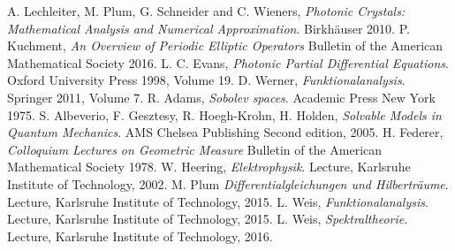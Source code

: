 \begin{thebibliography}{00}
   A. Lechleiter, M. Plum, G. Schneider and C. Wieners, {\it Photonic Crystals: Mathematical Analysis and Numerical Approximation}. Birkh{\"a}user 2010.
   P. Kuchment, {\it An Overview of Periodic Elliptic Operators} Bulletin of the American Mathematical Society 2016.
   L. C. Evans, {\it Photonic Partial Differential Equations}. Oxford University Press 1998, Volume 19.
   D. Werner, {\it Funktionalanalysis}. Springer 2011, Volume 7.
   R. Adams, {\it Sobolev spaces}. Academic Press New York 1975.
   S. Albeverio, F. Gesztesy, R. Hoegh-Krohn, H. Holden, {\it Solvable Models in Quantum Mechanics}. AMS Chelsea Publishing Second edition, 2005.
   H. Federer, {\it Colloquium Lectures on Geometric Measure} Bulletin of the American Mathematical Society 1978.
   W. Heering, {\it Elektrophysik}. Lecture, Karlsruhe Institute of Technology, 2002.
   M. Plum {\it Differentialgleichungen und Hilberträume}. Lecture, Karlsruhe Institute of Technology, 2015.
   L. Weis, {\it Funktionalanalysis}. Lecture, Karlsruhe Institute of Technology, 2015.
   L. Weis, {\it Spektraltheorie}. Lecture, Karlsruhe Institute of Technology, 2016.
\end{thebibliography} 